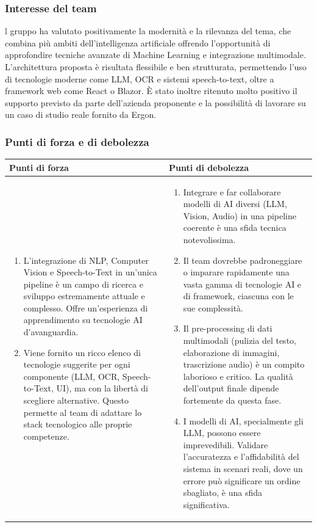 \documentclass[a4paper,11pt]{article}
\begin{document}
\subsubsection{Interesse del team}
\parbox[t]{\linewidth}{%
l gruppo ha valutato positivamente la modernità e la rilevanza del tema, che
combina più ambiti dell'intelligenza artificiale offrendo l'opportunità di
approfondire tecniche avanzate di Machine Learning e integrazione multimodale.
L'architettura proposta è risultata flessibile e ben strutturata, permettendo l'uso di
tecnologie moderne come LLM, OCR e sistemi speech-to-text, oltre a framework
web come React o Blazor. È stato inoltre ritenuto molto positivo il supporto
previsto da parte dell'azienda proponente e la possibilità di lavorare su un caso di
studio reale fornito da Ergon.
}
\newpage
\subsubsection{Punti di forza e di debolezza}

{\footnotesize
\begin{tabularx}{\textwidth}{|X|X|}
\hline
\rowcolor{lightgray!40} %
\textbf{Punti di forza} & \textbf{Punti di debolezza} \\
\hline
\begin{enumerate}
\item L'integrazione di NLP, Computer Vision e Speech-to-Text in un'unica pipeline è un campo di ricerca e sviluppo estremamente attuale e complesso. Offre un'esperienza di apprendimento su tecnologie AI d'avanguardia.
\item Viene fornito un ricco elenco di tecnologie suggerite per ogni componente (LLM, OCR, Speech-to-Text, UI), ma con la libertà di scegliere alternative. Questo permette al team di adattare lo stack tecnologico alle proprie competenze.
\end{enumerate}
 & \begin{enumerate}
\item Integrare e far collaborare modelli di AI diversi (LLM, Vision, Audio) in una pipeline coerente è una sfida tecnica notevolissima.
\item Il team dovrebbe padroneggiare o imparare rapidamente una vasta gamma di tecnologie AI e di framework, ciascuna con le sue complessità.
\item Il pre-processing di dati multimodali (pulizia del testo, elaborazione di immagini, trascrizione audio) è un compito laborioso e critico. La qualità dell'output finale dipende fortemente da questa fase.
\item I modelli di AI, specialmente gli LLM, possono essere imprevedibili. Validare l'accuratezza e l'affidabilità del sistema in scenari reali, dove un errore può significare un ordine sbagliato, è una sfida significativa.
\end{enumerate} \\
\hline
\end{tabularx}
}
\end{document}

